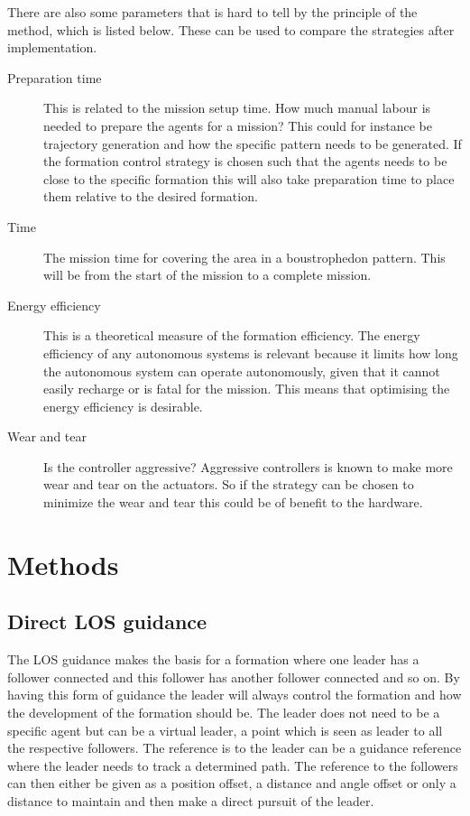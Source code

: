 There are also some parameters that is hard to tell by the principle
of the method, which is listed below. These can be used to compare the
strategies after implementation.
\begin{description}
\item[Preparation time] This is related to the mission setup time. How
	much manual labour is needed to prepare the agents for a mission?
	This could for instance be trajectory generation and how the
	specific pattern needs to be generated. If the formation control strategy is chosen such that the agents needs to be close to the specific formation this will also take preparation time to place them relative to the desired formation.
\item[Time] The mission time for covering the area in a boustrophedon
	pattern. This will be from the start of the mission to a complete mission.
\item[Energy efficiency] This is a theoretical measure of the
	formation efficiency. The energy efficiency of any autonomous systems is relevant because it limits how long the autonomous system can operate autonomously, given that it cannot easily recharge or is fatal for the mission. This means that optimising the energy efficiency is desirable.
\item[Wear and tear] Is the controller aggressive? Aggressive
	controllers is known to make more wear and tear on the actuators. So
	if the strategy can be chosen to minimize the wear and tear this
	could be of benefit to the hardware.
\end{description}


\section{Methods}

\subsection{Direct LOS guidance}
The \ac{LOS} guidance makes the basis for a formation where one leader has a follower connected and this follower has another follower connected and so on. By having this form of guidance the leader will always control the formation and how the development of the formation should be. The leader does not need to be a specific agent but can be a virtual leader, a point which is seen as leader to all the respective followers. The reference is to the leader can be a guidance reference where the leader needs to track a determined path. The reference to the followers can then either be given as a position offset, a distance and angle offset or only a distance to maintain and then make a direct pursuit of the leader.
